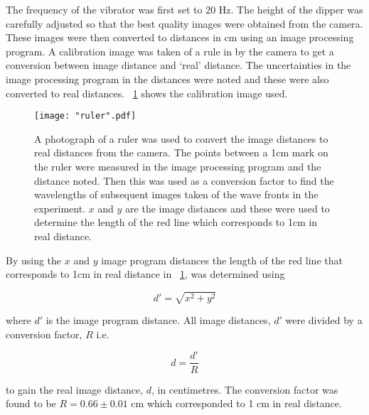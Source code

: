 \documentclass{article}
\newcommand{\figref}[2][\figurename~]{#1\ref{#2}}
\begin{document}
\newpage
\vspace{2mm}
\noindent
The frequency of the vibrator was first set to 20 Hz. The height of the dipper was carefully adjusted so that the best quality images were obtained from the camera. These images were then converted to distances in cm using an image processing program. A calibration image was taken of a rule in by the camera to get a conversion between image distance and `real' distance. The uncertainties in the image processing program in the distances were noted and these were also converted to real distances. \figref{fig:ruler} shows the calibration image used. 

\begin{figure}[h]
\centering
\texttt{[image: "ruler".pdf]}
\caption{A photograph of a ruler was used to convert the image distances to real distances from the camera. The points between a 1cm mark on the ruler were measured in the image processing program and the distance noted. Then this was used as a conversion factor to find the wavelengths of subsequent images taken of the wave fronts in the experiment. $x$ and $y$ are the image distances and these were used to determine the length of the red line which corresponds to 1cm in real distance.}
\label{fig:ruler}
\end{figure}

\newpage
\vspace{2mm}
\noindent
By using the $x$ and $y$ image program distances the length of the red line that corresponds to 1cm in real distance in \figref{fig:ruler}, was determined using 

\vspace{2mm}
\noindent
\begin{equation}
\label{eq:pythagoras}
d' = \sqrt{x^2 + y^2}
\end{equation}

\vspace{2mm}
\noindent
where $d'$ is the image program distance. All image distances, $d'$ were divided by a conversion factor, $R$ i.e.

\vspace{2mm}
\noindent
\begin{equation}
\label{eq:conversion}
d = \frac{d'}{R}
\end{equation}

\vspace{2mm}
\noindent
to gain the real image distance, $d$, in centimetres. The conversion factor was found to be $R = 0.66 \pm 0.01$ cm which corresponded to 1 cm in real distance.
\end{document}
